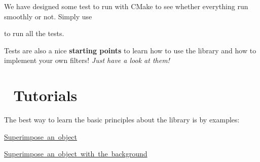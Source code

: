  We have designed some test to run with {\ttfamily C\+Make} to see whether everything run smoothly or not. Simply use 
 to run all the tests.

Tests are also a nice {\bfseries starting points} to learn how to use the library and how to implement your own filters! {\itshape Just have a look at them!}\hypertarget{index_tutorials}{}\section{📘 Tutorials}\label{index_tutorials}


 The best way to learn the basic principles about the library is by examples\+:
\begin{DoxyItemize}
\item \mbox{\hyperlink{tutorial_superimpose}{Superimpose an object}}
\item \mbox{\hyperlink{tutorial_superimpose_background}{Superimpose an object with the background}} 
\end{DoxyItemize}